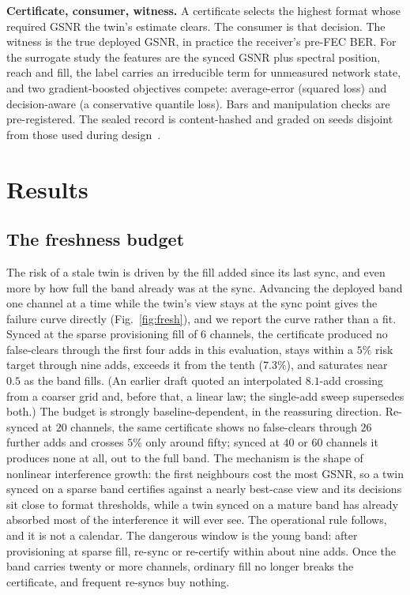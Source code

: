 \documentclass[letterpaper,10pt]{article}
\begin{document}
\textbf{Certificate, consumer, witness.} A certificate selects the highest format
whose required GSNR the twin's estimate clears. The consumer is that decision. The
witness is the true deployed GSNR, in practice the receiver's pre-FEC BER. For the
surrogate study the features are the synced GSNR plus spectral position, reach and
fill, the label carries an irreducible term for unmeasured network state, and two
gradient-boosted objectives compete: average-error (squared loss) and
decision-aware (a conservative quantile loss). Bars and manipulation checks are
pre-registered. The sealed record is content-hashed and graded on seeds disjoint
from those used during design~\cite{otcampaigns}.

\section{Results}
\subsection{The freshness budget}
The risk of a stale twin is driven by the fill added since its last sync, and
even more by how full the band already was at the sync. Advancing
the deployed band one channel at a time while the twin's view stays at the sync
point gives the failure curve directly (Fig.~\ref{fig:fresh}), and we report
the curve rather than a fit. Synced at the sparse provisioning fill of $6$
channels, the certificate produced no false-clears through the first four adds
in this evaluation, stays within a $5\%$ risk target through nine adds, exceeds
it from the tenth ($7.3\%$), and saturates near $0.5$ as the band fills. (An
earlier draft quoted an interpolated $8.1$-add crossing from a coarser grid and,
before that, a linear law; the single-add sweep supersedes both.) The budget is
strongly baseline-dependent, in the reassuring direction. Re-synced at $20$
channels, the same certificate shows no false-clears through $26$ further adds
and crosses $5\%$ only around fifty; synced at $40$ or $60$ channels it produces
none at all, out to the full band. The mechanism is the shape of nonlinear
interference growth: the first neighbours cost the most GSNR, so a twin synced
on a sparse band certifies against a nearly best-case view and its decisions
sit close to format thresholds, while a twin synced on a mature band has
already absorbed most of the interference it will ever see. The operational
rule follows, and it is not a calendar. The dangerous window is the young band:
after provisioning at sparse fill, re-sync or re-certify within about nine
adds. Once the band carries twenty or more channels, ordinary fill no longer
breaks the certificate, and frequent re-syncs buy nothing.
\end{document}
